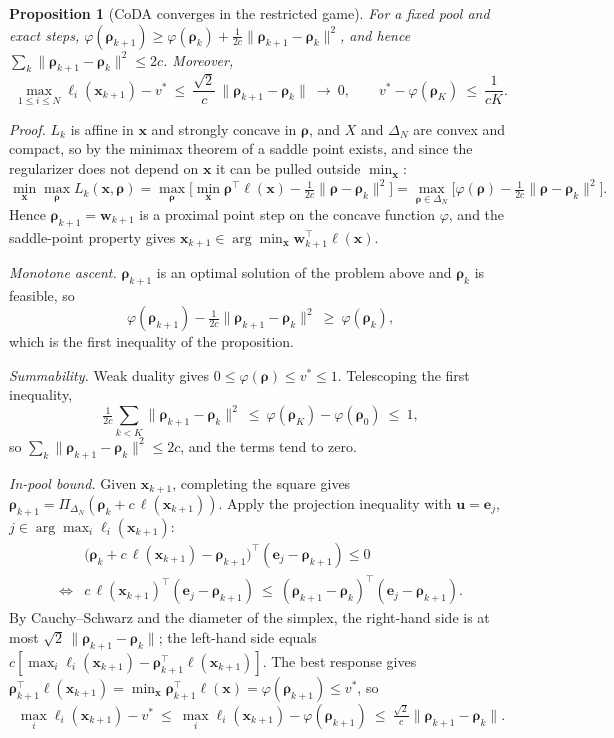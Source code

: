 \documentclass{article} %
\theoremstyle{plain}
\newtheorem{proposition}[theorem]{Proposition}
\theoremstyle{remark}
\newcommand{\Proj}{\Pi}
\newcommand{\simplex}{\Delta}
\newcommand{\bx}{{\bm{x}}}
\newcommand{\bw}{{\bm{w}}}
\newcommand{\bu}{{\bm{u}}}
\newcommand{\be}{{\bm{e}}}
\newcommand{\brho}{{\bm{\rho}}}
\newcommand{\bell}{{\bm{\ell}}}
\newcommand{\coda}{CoDA}
\begin{document}
\begin{proposition}[\coda{} converges in the restricted game]
\label{prop:coda}
For a fixed pool and exact steps, $\varphi(\brho_{k+1})\ge\varphi(\brho_k)+\tfrac1{2c}\|\brho_{k+1}-\brho_k\|^2$, and hence $\sum_k\|\brho_{k+1}-\brho_k\|^2\le2c$. Moreover,
\[
\max_{1\le i\le N}\ell_i(\bx_{k+1})-v^*\ \le\ \frac{\sqrt2}{c}\,\|\brho_{k+1}-\brho_k\|\ \longrightarrow\ 0 ,\qquad v^*-\varphi(\brho_K)\ \le\ \frac{1}{cK} .
\]
\end{proposition}
\textit{Proof.} $L_k$ is affine in $\bx$ and strongly concave in $\brho$, and $X$ and $\simplex_N$ are convex and compact, so by the minimax theorem of \citet{sion1958} a saddle point exists, and since the regularizer does not depend on $\bx$ it can be pulled outside $\min_\bx$:
\[
\min_{\bx}\max_{\brho}L_k(\bx,\brho)=\max_{\brho}\Big[\min_\bx\brho^\top\bell(\bx)-\tfrac1{2c}\|\brho-\brho_k\|^2\Big]=\max_{\brho\in\simplex_N}\Big[\varphi(\brho)-\tfrac1{2c}\|\brho-\brho_k\|^2\Big].
\]
Hence $\brho_{k+1}=\bw_{k+1}$ is a proximal point step on the concave function $\varphi$, and the saddle-point property gives $\bx_{k+1}\in\arg\min_\bx\bw_{k+1}^\top\bell(\bx)$.

\textit{Monotone ascent.} $\brho_{k+1}$ is an optimal solution of the problem above and $\brho_k$ is feasible, so
\[
\varphi(\brho_{k+1})-\tfrac1{2c}\|\brho_{k+1}-\brho_k\|^2\ \ge\ \varphi(\brho_k) ,
\]
which is the first inequality of the proposition.

\textit{Summability.} Weak duality gives $0\le\varphi(\brho)\le v^*\le1$. Telescoping the first inequality,
\[
\tfrac1{2c}\sum_{k<K}\|\brho_{k+1}-\brho_k\|^2\ \le\ \varphi(\brho_K)-\varphi(\brho_0)\ \le\ 1 ,
\]
so $\sum_k\|\brho_{k+1}-\brho_k\|^2\le2c$, and the terms tend to zero.

\textit{In-pool bound.} Given $\bx_{k+1}$, completing the square gives $\brho_{k+1}=\Proj_{\simplex_N}(\brho_k+c\,\bell(\bx_{k+1}))$. Apply the projection inequality with $\bu=\be_j$, $j\in\arg\max_i\ell_i(\bx_{k+1})$:
\begin{align*}
&\big(\brho_k+c\,\bell(\bx_{k+1})-\brho_{k+1}\big)^\top(\be_j-\brho_{k+1})\le0\\
\iff{}&
c\,\bell(\bx_{k+1})^\top(\be_j-\brho_{k+1})\ \le\ (\brho_{k+1}-\brho_k)^\top(\be_j-\brho_{k+1}) .
\end{align*}
By Cauchy--Schwarz and the diameter of the simplex, the right-hand side is at most $\sqrt2\,\|\brho_{k+1}-\brho_k\|$; the left-hand side equals $c[\max_i\ell_i(\bx_{k+1})-\brho_{k+1}^\top\bell(\bx_{k+1})]$. The best response gives $\brho_{k+1}^\top\bell(\bx_{k+1})=\min_\bx\brho_{k+1}^\top\bell(\bx)=\varphi(\brho_{k+1})\le v^*$, so
\[
\max_i\ell_i(\bx_{k+1})-v^*\ \le\ \max_i\ell_i(\bx_{k+1})-\varphi(\brho_{k+1})\ \le\ \tfrac{\sqrt2}{c}\|\brho_{k+1}-\brho_k\| .
\]
\end{document}
